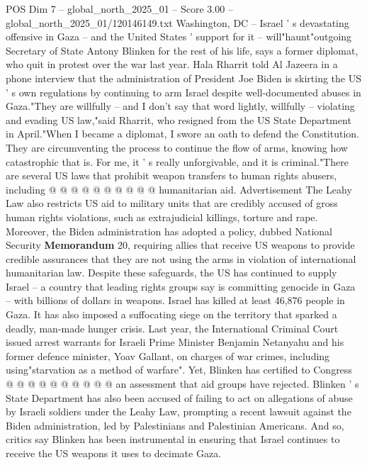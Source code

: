 \begin{textsample}{POS Dim 7 – global\_north\_2025\_01 – Score 3.00 – global\_north\_2025\_01/120146149.txt}  \label{ex:f7_pos_390}
Washington, DC -- Israel ' s devastating offensive in Gaza -- and the United States ' support for it -- will"haunt"outgoing Secretary of State Antony Blinken for the rest of his life, says a former diplomat, who quit in protest over the war last year.
Hala Rharrit told Al Jazeera in a phone interview that the administration of President Joe Biden is skirting the US ' s own regulations by continuing to arm Israel despite well-documented abuses in Gaza."They are willfully -- and I don't say that word lightly, willfully -- violating and evading US law,"said Rharrit, who resigned from the US State Department in April."When I became a diplomat, I swore an oath to defend the Constitution.
They are circumventing the process to continue the flow of arms, knowing how catastrophic that is.
For me, it ' s really unforgivable, and it is criminal."There are several US laws that prohibit weapon transfers to human rights abusers, including @ @ @ @ @ @ @ @ @ @ humanitarian aid.
Advertisement The Leahy Law also restricts US aid to military units that are credibly accused of gross human rights violations, such as extrajudicial killings, torture and rape.
Moreover, the Biden administration has adopted a policy, dubbed National Security \textbf{Memorandum} 20, requiring allies that receive US weapons to provide credible assurances that they are not using the arms in violation of international humanitarian law.
Despite these safeguards, the US has continued to supply Israel -- a country that leading rights groups say is committing genocide in Gaza -- with billions of dollars in weapons.
Israel has killed at least 46,876 people in Gaza.
It has also imposed a suffocating siege on the territory that sparked a deadly, man-made hunger crisis.
Last year, the International Criminal Court issued arrest warrants for Israeli Prime Minister Benjamin Netanyahu and his former defence minister, Yoav Gallant, on charges of war crimes, including using"starvation as a method of warfare".
Yet, Blinken has certified to Congress @ @ @ @ @ @ @ @ @ @ an assessment that aid groups have rejected.
Blinken ' s State Department has also been accused of failing to act on allegations of abuse by Israeli soldiers under the Leahy Law, prompting a recent lawsuit against the Biden administration, led by Palestinians and Palestinian Americans.
And so, critics say Blinken has been instrumental in ensuring that Israel continues to receive the US weapons it uses to decimate Gaza.

\end{textsample}
